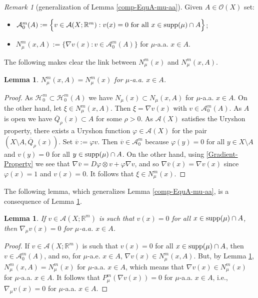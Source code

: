 \documentclass[10pt]{amsart}
\numberwithin{equation}{section}
\newtheorem{lemma}[theorem]{Lemma}
\theoremstyle{definition}
\theoremstyle{remark}
\newtheorem{remark}[theorem]{Remark}
\begin{document}
\begin{remark}[generalization of Lemma \ref{comp-EquA-mu-aa}]\label{Remark-Generalization-of-Lemmacomp-EquA-mu-aa}
Given $A\in\mathcal{O}(X)$ set:
\begin{itemize}
\item $\mathcal{A}^m_0(A):=\Big\{v\in\mathcal{A}(X;{{\mathbb R}}^m):v(x)=0\hbox{ for all } x\in{{\rm supp}}(\mu)\cap A\Big\}$;
\item $N^m_\mu(x,A):=\Big\{\nabla v(x):v\in\mathcal{A}^m_0(A)\Big\}$ for $\mu$-a.a. $x\in A$.
\end{itemize}
The following makes clear the link between $N_\mu^m(x)$ and $N_\mu^m(x,A)$.
\begin{lemma}\label{ReMaRK-GeneRalIzAtION-LeMMa}
$N_\mu^m(x,A)=N_\mu^m(x)$ for $\mu$-a.a. $x\in A$.
\end{lemma}
\begin{proof}
As $\mathcal{H}^m_0\subset\mathcal{H}^m_0(A)$ we have $N_\mu(x)\subset N_\mu(x,A)$ for $\mu$-a.a. $x\in A$. On the other hand, let $\xi\in N_\mu^m(x,A)$. Then $\xi=\nabla v(x)$ with $v\in\mathcal{A}^m_0(A)$. As $A$ is open we have $\overline{Q}_\rho(x)\subset A$ for some $\rho>0$. As $\mathcal{A}(X)$ satisfies the Uryshon property, there exists a Uryshon function $\varphi\in\mathcal{A}(X)$ for the pair $(X\setminus A,\overline{Q}_\rho(x))$. Set $\overline{v}:=\varphi v$. Then $\overline{v}\in\mathcal{A}^m_0$ because $\varphi(y)=0$ for all $y\in X\setminus A$ and $v(y)=0$ for all $y\in{{\rm supp}}(\mu)\cap A$. On the other hand, using \eqref{Gradient-Property} we see that $\nabla \overline{v}=D\varphi\otimes v+\varphi\nabla v$, and so $\nabla \overline{v}(x)=\nabla v(x)$ since $\varphi(x)=1$ and $v (x)=0$. It follows that $\xi\in N^m_\mu(x)$.
\end{proof}

\medskip

The following lemma, which generalizes Lemma \ref{comp-EquA-mu-aa}, is a consequence of Lemma \ref{ReMaRK-GeneRalIzAtION-LeMMa}.

\begin{lemma}
If $v\in\mathcal{A}(X;{{\mathbb R}}^m)$ is such that $v(x)=0$ for all $x\in{{\rm supp}}(\mu)\cap A$, then $\nabla_\mu v(x)=0$ for $\mu$-a.a. $x\in A$.
\end{lemma}
\begin{proof}
If $v\in\mathcal{A}(X;{{\mathbb R}}^m)$ is such that $v(x)=0$ for all $x\in{{\rm supp}}(\mu)\cap A$, then $v\in\mathcal{A}^m_0(A)$, and so, for $\mu$-a.e. $x\in A$, $\nabla v(x)\in N_\mu^m(x,A)$. But, by Lemma \ref{ReMaRK-GeneRalIzAtION-LeMMa}, $N_\mu^m(x,A)=N_\mu^m(x)$ for $\mu$-a.a. $x\in A$, which means that $\nabla v(x)\in N_\mu^m(x)$ for $\mu$-a.a. $x\in A$. It follows that $P_\mu^m(\nabla v(x))=0$ for $\mu$-a.a. $x\in A$, i.e., $\nabla_\mu v(x)=0$ for $\mu$-a.a. $x\in A$.
\end{proof}
\end{remark}
\end{document}

